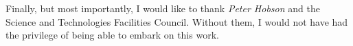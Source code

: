 \documentclass[11pt,a4paper]{report}
\begin{document}
Finally, but most importantly, I would like to thank \textit{Peter Hobson} and the Science and Technologies Facilities Council.
Without them, I would not have had the privilege of being able to embark on this work. 

\tableofcontents
\listoftables
\listoffigures



















\begin{appendices}

%

\end{appendices}



 
\end{document}
